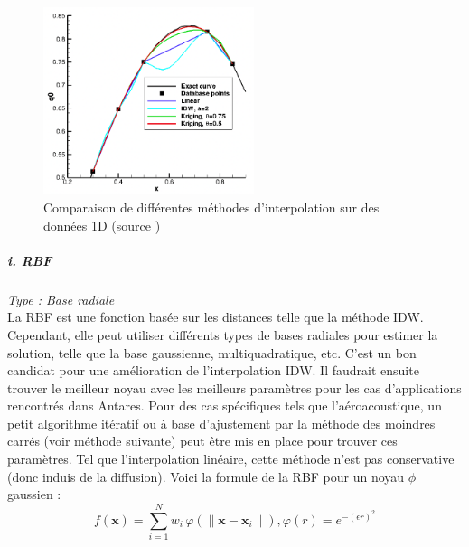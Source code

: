 
\begin{figure}[H]
    \centering
    \includegraphics[width=0.55\textwidth]{images/palmer2009_comp_copie.png}
    \caption{Comparaison de différentes méthodes d'interpolation sur des données 1D (source \cite{palmer2009})}
    \label{fig:compar}
\end{figure}

\subparagraph{i. RBF \cite{opencfs}}
\textit{Type : Base radiale} \\
\phantom{----}La \ac{RBF} est une fonction basée sur les distances telle que la méthode IDW. Cependant, elle peut utiliser différents types de bases radiales pour estimer la solution, telle que la base gaussienne, multiquadratique, etc. C'est un bon candidat pour une amélioration de l'interpolation IDW. Il faudrait ensuite trouver le meilleur noyau avec les meilleurs paramètres pour les cas d'applications rencontrés dans Antares. Pour des cas spécifiques tels que l'aéroacoustique, un petit algorithme itératif ou à base d'ajustement par la méthode des moindres carrés (voir méthode suivante) peut être mis en place pour trouver ces paramètres. Tel que l'interpolation linéaire, cette méthode n'est pas conservative (donc induis de la diffusion).
Voici la formule de la RBF pour un noyau \(\phi\) gaussien :
\begin{equation}
f(\mathbf{x}) = \sum_{i=1}^{N} w_{i} \, \varphi \left( \|\mathbf{x} - \mathbf{x}_{i}\| \right), \varphi(r) = e^{-(\epsilon r)^{2}}
\end{equation}

